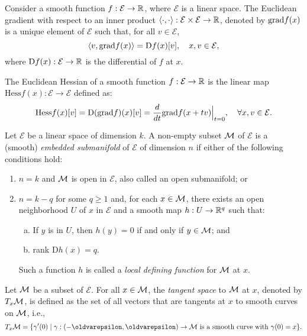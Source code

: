 \begin{definition}
    Consider a smooth function $f: \mathcal{E} \to \mathbb{R}$, where $\mathcal{E}$ is a linear space. The Euclidean gradient with respect to an inner product $\langle \cdot, \cdot \rangle: \mathcal{E} \times \mathcal{E} \to \mathbb{R}$, denoted by $\mathrm{grad }{f}(x)$ is a unique element of $\mathcal{E}$ such that, for all $v \in \mathcal{E}$, 
    \[
        \langle v, \mathrm{grad }{f}(x) \rangle = \textrm{D}f(x)[v],\quad x,v \in \mathcal{E},
    \]
    where $\textrm{D}f(x) : \mathcal{E} \to \mathbb{R}$ is the differential of $f$ at $x$.
\end{definition}

\begin{definition}
    The Euclidean Hessian of a smooth function $f: \mathcal{E} \to \mathbb{R}$ is the linear map $\textrm{Hess}f(x) : \mathcal{E} \to \mathcal{E}$ defined as:
    \[
        \textrm{Hess}f(x)[v] = \textrm{D}(\grad{f})(x)[v] = \frac{d}{dt} \grad{f}(x + tv) \Big|_{t = 0}, \quad \forall x,v \in \mathcal{E}.
    \]
\end{definition}

\begin{definition}
    Let $\mathcal{E}$ be a linear space of dimension $k$. A non-empty subset $\mathcal{M}$ of $\mathcal{E}$ is a (smooth) \textit{embedded submanifold} of $\mathcal{E}$ of dimension $n$ if either of the following conditions hold:
    \begin{enumerate}
        \item $n=k$ and $\mathcal{M}$ is open in $\mathcal{E}$, also called an open submanifold; or 
        \item $n=k-q$ for some $q \geq 1$ and, for each $x \in \mathcal{M}$, there exists an open neighborhood $U$ of $x$ in $\mathcal{E}$ and a smooth map $h : U \to \mathbb{R}^q$ such that:
        \begin{enumerate}[(a)]
            \item If $y$ is in $U$, then $h(y) = 0$ if and only if $y \in \mathcal{M}$; and
            \item \textrm{rank} $\textrm{D}h(x) = q$.
        \end{enumerate}
        Such a function $h$ is called a \textit{local defining function} for $\mathcal{M}$ at $x$.
    \end{enumerate}
    
\end{definition}

\begin{definition}
   Let $\mathcal{M}$ be a subset of $\mathcal{E}$. For all $x \in \mathcal{M}$, the \textit{tangent space} to $\mathcal{M}$ at $x$, denoted by $T_x \mathcal{M}$, is defined as the set of all vectors that are tangents at $x$ to smooth curves on $\mathcal{M}$, i.e.,
   \[
        T_x \M = \{ \gamma'(0) \mid \gamma : (-\epsilon, \epsilon) \to \M \textrm{ is a smooth curve with } \gamma(0) = x \}.
   \]
\end{definition}

